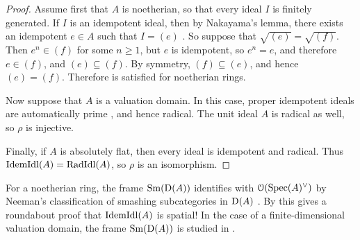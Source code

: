 \documentclass{amsart}
\begin{document}
    \begin{proof}
        Assume first that $A$ is noetherian, so that every ideal $I$ is finitely generated. If $I$ is an idempotent ideal, then by Nakayama's lemma, there exists an idempotent $e \in A$ such that $I = (e)$ \cite[\href{https://stacks.math.columbia.edu/tag/00EH}{Tag 00EH}]{stacks-project}. So suppose that $\sqrt{(e)} = \sqrt{(f)}$. Then $e^n \in (f)$ for some $n \ge 1$, but $e$ is idempotent, so $e^n = e$, and therefore $e \in (f)$, and $(e) \subseteq (f)$. By symmetry, $(f) \subseteq (e)$, and hence $(e) = (f)$. Therefore  is satisfied for noetherian rings. 
    
        Now suppose that $A$ is a valuation domain. In this case, proper idempotent ideals are automatically prime \cite[Theorem 17.1(3)]{Gilmer1992Multiplicative}, and hence radical. The unit ideal $A$ is radical as well, so $\rho$ is injective.
            
        Finally, if $A$ is absolutely flat, then every ideal is idempotent and radical. Thus $\mathrm{IdemIdl}(A)=\operatorname{RadIdl}(A)$, so $\rho$ is an isomorphism.
    \end{proof}
    \begin{Rem}
        For a noetherian ring, the frame $\operatorname{Sm}(\operatorname{D}(A))$ identifies with $\mathcal{O}(\operatorname{Spec}(A)^{\vee})$ by Neeman's classification of smashing subcategories in $\operatorname{D}(A)$ \cite[Section 3]{Neeman1992Chromatic}. By  this gives a roundabout proof that $\mathrm{IdemIdl}(A)$ is spatial! In the case of a finite-dimensional valuation domain, the frame $\operatorname{Sm}(\operatorname{D}(A))$ is studied in \cite{BalchinTecklenburg2025Classifying}. 
    \end{Rem}
\end{document}

